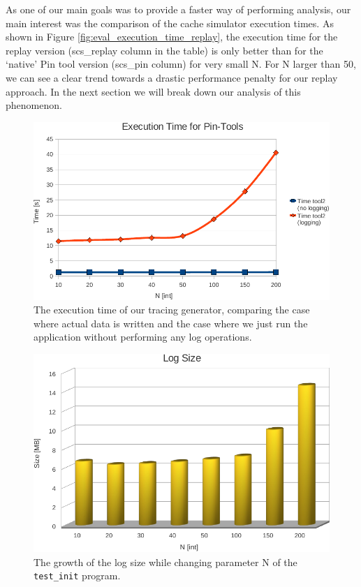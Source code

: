 As one of our main goals was to provide a faster way of performing analysis,
our main interest was the comparison of the cache simulator execution
times. As shown in Figure \ref{fig:eval_execution_time_replay}, the
execution time for the replay version (scs\_replay column in the table) is only better 
than for the `native' Pin tool version (scs\_pin column) for very small N.
For N larger than 50, we can see a clear trend towards a drastic performance penalty
for our replay approach. In the next section we will break down our
analysis of this phenomenon.

\begin{figure}
  \includegraphics[width=\columnwidth]{eval_execution_time_tracing}
  \caption{The execution time of our tracing generator, comparing the
    case where actual data is written and the case where we just run
    the application without performing any log operations.}
  \label{fig:eval_execution_time_tracing}
\end{figure}

\begin{figure}
  \includegraphics[width=\columnwidth]{eval_log_size}
  \caption{The growth of the log size while changing parameter N of the \texttt{test\_init} program. }
  \label{fig:eval_log_size}
\end{figure}


